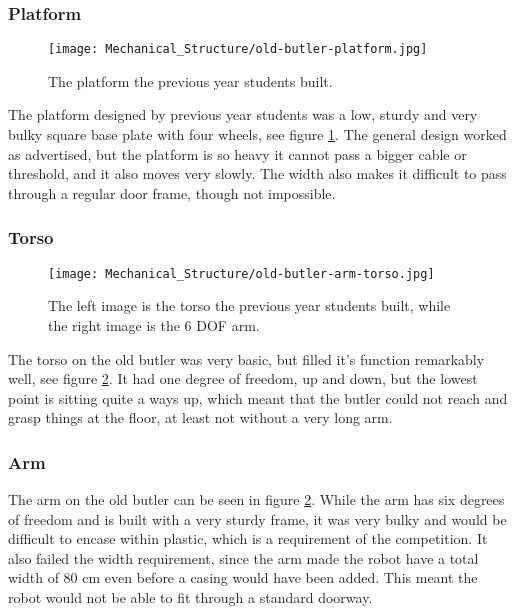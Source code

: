 \subsubsection{Platform}

\begin{figure}[!ht]
    \centering
    \texttt{[image: Mechanical\_Structure/old-butler-platform.jpg]}
    \caption{The platform the previous year students built.}
    \label{fig:old_butler_platform}
\end{figure}

The platform designed by previous year students was a low, sturdy and very bulky square base plate with four wheels, see figure \ref{fig:old_butler_platform}. The general design worked as advertised, but the platform is so heavy it cannot pass a bigger cable or threshold, and it also moves very slowly. The width also makes it difficult to pass through a regular door frame, though not impossible.

\subsubsection{Torso}

\begin{figure}[!ht]
    \centering
    \texttt{[image: Mechanical\_Structure/old-butler-arm-torso.jpg]}
    \caption{The left image is the torso the previous year students built, while the right image is the 6 DOF arm.}
    \label{fig:old_butler_arm_torso}
\end{figure}

The torso on the old butler was very basic, but filled it's function remarkably well, see figure \ref{fig:old_butler_arm_torso}. It had one degree of freedom, up and down, but the lowest point is sitting quite a ways up, which meant that the butler could not reach and grasp things at the floor, at least not without a very long arm.

\subsubsection{Arm}

The arm on the old butler can be seen in figure \ref{fig:old_butler_arm_torso}. While the arm has six degrees of freedom and is built with a very sturdy frame, it was very bulky and would be difficult to encase within plastic, which is a requirement of the competition. It also failed the width requirement, since the arm made the robot have a total width of 80 cm even before a casing would have been added. This meant the robot would not be able to fit through a standard doorway.

